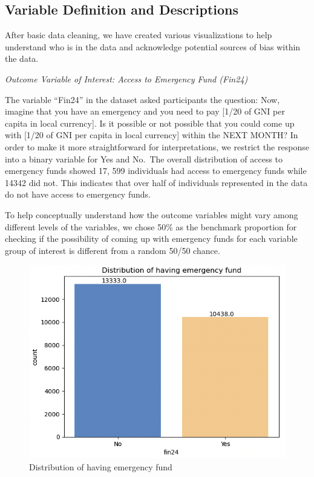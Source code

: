 \documentclass[12pt]{article}
\begin{document}
\hypertarget{variable-definition-and-descriptions}{%
\subsection{Variable Definition and
Descriptions}\label{variable-definition-and-descriptions}}

After basic data cleaning, we have created various visualizations to
help understand who is in the data and acknowledge potential sources of
bias within the data.

\emph{Outcome Variable of Interest: Access to Emergency Fund (Fin24)}

The variable ``Fin24'' in the dataset asked participants the question:
Now, imagine that you have an emergency and you need to pay {[}1/20 of
GNI per capita in local currency{]}. Is it possible or not possible that
you could come up with {[}1/20 of GNI per capita in local currency{]}
within the NEXT MONTH? In order to make it more straightforward for
interpretations, we restrict the response into a binary variable for Yes
and No.~The overall distribution of access to emergency funds showed 17,
599 individuals had access to emergency funds while 14342 did not. This
indicates that over half of individuals represented in the data do not
have access to emergency funds.

To help conceptually understand how the outcome variables might vary
among different levels of the variables, we chose 50\% as the benchmark
proportion for checking if the possibility of coming up with emergency
funds for each variable group of interest is different from a random
50/50 chance.

\begin{figure}

{\centering \includegraphics[width=0.7\linewidth]{graphs/f24_graph1} 

}

\caption{Distribution of having emergency fund}\label{fig:unnamed-chunk-2}
\end{figure}
\end{document}
